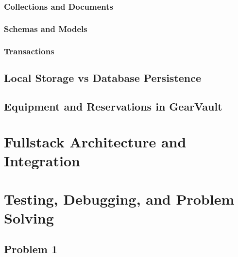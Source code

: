 \documentclass{article}[12pt]
\begin{document}
    \subsubsection{Collections and Documents}

    
    \subsubsection{Schemas and Models}
    
    \subsubsection{Transactions}
    
    \subsection{Local Storage vs Database Persistence}
    
    \subsection{Equipment and Reservations in GearVault}


    \section{Fullstack Architecture and Integration}


    \section{Testing, Debugging, and Problem Solving}
    \subsection{Problem 1}
\end{document}
